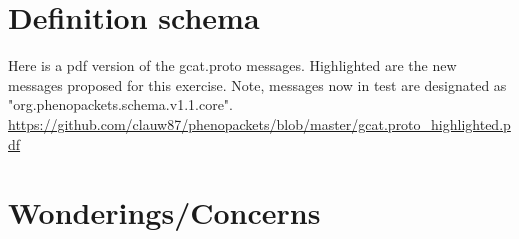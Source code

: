 \documentclass[a4paper, 10pt]{article}
\begin{document}
\section{Definition schema}

Here is a pdf version of the gcat.proto messages. Highlighted are the new messages proposed for this exercise. Note, messages now in test are designated as "org.phenopackets.schema.v1.1.core". \\

\url{https://github.com/clauw87/phenopackets/blob/master/gcat.proto\_highlighted.pdf}

\section{Wonderings/Concerns}
\end{document}

